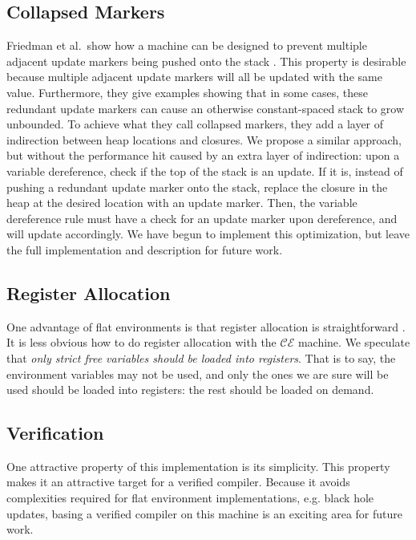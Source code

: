 \subsection{Collapsed Markers}
Friedman et al.\ show how a machine can be designed to prevent multiple adjacent
update markers being pushed onto the stack \cite{lkm}.  This property is
desirable because multiple adjacent update markers will all be updated with the
same value. Furthermore, they give examples showing that in some cases, these
redundant update markers can cause an otherwise constant-spaced stack to grow
unbounded. To achieve what they call collapsed markers, they add a layer
of indirection between heap locations and closures. We propose a similar
approach, but without the performance hit caused by an extra layer of
indirection: upon a variable dereference, check if the top of the stack is an
update. If it is, instead of pushing a redundant update marker onto the stack,
replace the closure in the heap at the desired location with an update marker.
Then, the variable dereference rule must have a check for an update marker upon
dereference, and will update accordingly. We have begun to implement this
optimization, but leave the full implementation and description for future work.

\subsection{Register Allocation} \label{sec:alloc}
One advantage of flat environments is that register allocation is
straightforward \cite{appel2006compiling,jonesstg,terei2010llvm}. It is less
obvious how to do register allocation with the $\mathcal{CE}$ machine.
We speculate that \emph{only strict free variables should be loaded into
registers}. That is to say, the environment variables may not be used, and only
the ones we are sure will be used should be loaded into registers: the rest
should be loaded on demand.

\subsection{Verification}
One attractive property of this implementation is its simplicity. This property
makes it an attractive target for a verified compiler. Because it avoids
complexities required for flat environment implementations, e.g. black hole
updates, basing a verified compiler on this machine is an exciting area for
future work. 
